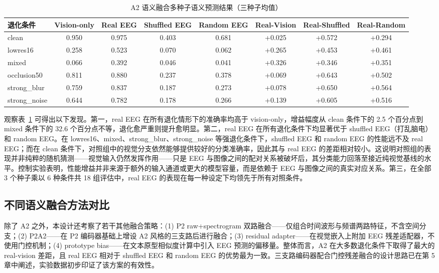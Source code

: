 \begin{table}[htbp]
  \centering
  \caption{A2 语义融合多种子语义预测结果（三种子均值）}
  \label{tab:a2-main}
  \begin{tabular}{l c c c c c c c}
    \toprule
    退化条件 & Vision-only & Real EEG & Shuffled EEG & Random EEG & Real-Vision & Real-Shuffled & Real-Random \\
    \midrule
    clean & 0.950 & 0.975 & 0.403 & 0.681 & +0.025 & +0.572 & +0.294 \\
    lowres16 & 0.258 & 0.523 & 0.070 & 0.062 & +0.265 & +0.453 & +0.461 \\
    mixed & 0.066 & 0.392 & 0.046 & 0.041 & +0.326 & +0.346 & +0.351 \\
    occlusion50 & 0.811 & 0.880 & 0.237 & 0.378 & +0.069 & +0.643 & +0.502 \\
    strong\_blur & 0.759 & 0.837 & 0.187 & 0.273 & +0.078 & +0.650 & +0.564 \\
    strong\_noise & 0.644 & 0.782 & 0.178 & 0.266 & +0.139 & +0.605 & +0.516 \\
    \bottomrule
  \end{tabular}
\end{table}

观察表~\ref{tab:a2-main} 可得出以下发现。第一，real EEG 在所有退化情形下的准确率均高于 vision-only，增益幅度从 clean 条件下的 2.5 个百分点到 mixed 条件下的 32.6 个百分点不等，退化愈严重则提升愈明显。第二，real EEG 在所有退化条件下均显著优于 shuffled EEG（打乱脑电）和 random EEG。在 lowres16、mixed、strong\_blur、strong\_noise 等强退化条件下，shuffled EEG 和 random EEG 的性能远不及 real EEG；而在 clean 条件下，对照组中的视觉分支依然能够提供较好的分类准确率，因此其与 real EEG 的差距相对较小。这说明对照组的表现并非纯粹的随机猜测——视觉输入仍然发挥作用——只是 EEG 与图像之间的配对关系被破坏后，其分类能力回落至接近纯视觉基线的水平。控制实验表明，性能增益并非来源于额外的输入通道或更大的模型容量，而是依赖于 EEG 与图像之间的真实对应关系。第三，在全部 3 个种子乘以 6 种条件共 18 组评估中，real EEG 的表现在每一种设定下均领先于所有对照条件。


\subsection{不同语义融合方法对比}

除了 A2 之外，本设计还考察了若干其他融合策略：(1) P2 raw+spectrogram 双路融合——仅组合时间波形与频谱两路特征，不含空间分支；(2) P2A2——在 P2 编码器基础上增设 A2 风格的三支路后进行融合；(3) residual adapter——在视觉嵌入上附加 EEG 残差适配器，不使用门控机制；(4) prototype bias——在文本原型相似度计算中引入 EEG 预测的偏移量。整体而言，A2 在大多数退化条件下取得了最大的 real-vision 差距，且 real EEG 相对于 shuffled EEG 和 random EEG 的优势最为一致。三支路编码器配合门控残差融合的设计思路已在第 5 章中阐述，实验数据初步印证了该方案的有效性。

